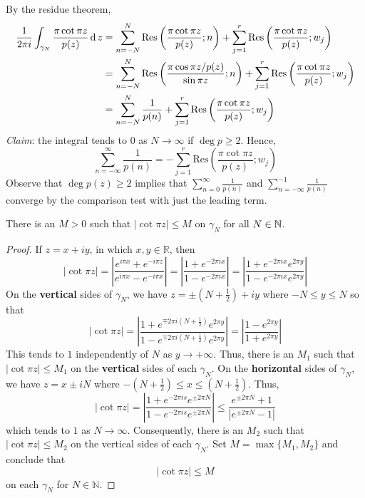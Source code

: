 \documentclass[12pt]{article}
\renewcommand{\d}{\ensuremath{\operatorname{d}}}
\begin{document}
By the residue theorem,\hypertarget{cotangent-integral}{}
\begin{align*}
    {\frac{1}{2\pi i}}\int_{\gamma_{N}}{\frac{\pi\cot\pi z}{p(z)}}\d z&=\sum_{n=-N}^{N}\Res \left({\frac{\pi\cot\pi z}{p(z)}};n\right)+\sum_{j=1}^{r}\Res \left({\frac{\pi\cot\pi z}{p(z)}};w_{j}\right)\\
    &= \sum_{n=-N}^{N}\Res \left({\frac{\pi\cos\pi z/p(z)}{\sin \pi z}};n\right)+\sum_{j=1}^{r}\Res \left({\frac{\pi\cot\pi z}{p(z)}};w_{j}\right)\\
    &= \sum_{n=-N}^{N}\frac{1}{p(n)}+\sum_{j=1}^{r}\Res \left(\frac{\pi\cot \pi z}{p(z)}; w_j\right)
\end{align*}
\textit{Claim}: the integral tends to 0 as $N\to \infty$ if $\deg p\geq 2$. \hypertarget{integral-of-1-over-pn}{Hence}, \[\sum_{n=-\infty}^{\infty}{\frac{1}{p(n)}}=-\sum_{j=1}^{r}\mathrm{Res}\left({\frac{\pi\cot\pi z}{p(z)}};w_{j}\right)\]
Observe that $\deg p(z)\geq2$ implies that $\sum_{n=0}^\infty\frac{1}{p(n)}$ and $\sum_{n=-\infty}^{-1}\frac{1}{p(n)}$ converge by the comparison test with just the leading term.

\begin{lemma}
    There is an $M > 0$ such that $|\cot \pi z|\leq M$ on $\gamma_N$ for all $N\in \mathbb{N}$. 
\end{lemma}
\begin{proof}
    If $z=x+iy$, in which $x,y\in\mathbb{R}$, then
\[|\cot\pi z|=\left|\frac{e^{i\pi x}+e^{-i\pi z}}{e^{i\pi x}-e^{-i\pi x}}\right|=\left|\frac{1+e^{-2\pi ix}}{1-e^{-2\pi ix}}\right|=\left|\frac{1+e^{-2\pi ix}e^{2\pi y}}{1-e^{-2\pi ix}e^{2\pi y}}\right|\]
On the \textbf{vertical} sides of $\gamma_{N}$, we have $z=\pm(N+\frac{1}{2})+iy$ where $-N\leq y\leq N$ so that
\[|\cot\pi z|=\left|\frac{1+e^{\mp2\pi i(N+\frac{1}{2})}e^{2\pi y}}{1-e^{\mp2\pi i(N+\frac{1}{2})}e^{2\pi y}}\right|=\left|\frac{1-e^{2\pi y}}{1+e^{2\pi y}}\right|\]
This tends to $1$ independently of $N$ as $y\to+\infty$. Thus, there is an $M_1$ such that $|\cot \pi z|\leq M_1$ on the \textbf{vertical} sides of each $\gamma_{N}$.
On the \textbf{horizontal} sides of $\gamma_{N}$, we have $z=x\pm iN$ where $-(N+\frac{1}{2})\leq x\leq(N+\frac{1}{2})$.
Thus,
$$|\cot\pi z|=\left|\frac{1+e^{-2\pi is}e^{\pm2\pi N}}{1-e^{-2\pi is}e^{\pm2\pi N}}\right|\leq\frac{e^{\pm2\pi N}+1}{|e^{\pm2\pi N}-1|}$$
which tends to $1$ as $N\to\infty$. Consequently, there is an $M_{2}$ such that $|\cot\pi z|\leq M_{2}$ on the vertical sides of each $\gamma_{N}$.
Set $M=\max\{M_{1},M_{2}\}$ and conclude that
\[|\cot\pi z|\leq M\]
on each $\gamma_{N}$ for $N\in\mathbb{N}$.
\end{proof}
\end{document}
